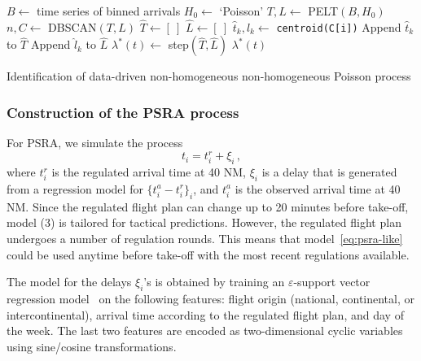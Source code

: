 \documentclass[draft,review]{elsarticle}
\begin{document}
\begin{algorithm}
\begin{algorithmic}[1]
    \STATE \(B \leftarrow \) time series of binned arrivals
    \STATE \(H_0 \leftarrow \) `Poisson'
    \STATE \(T, L \leftarrow \) PELT\((B, H_0)\)
    \STATE \(n, C \leftarrow \) DBSCAN\((T, L)\)
    \STATE {}
    \STATE \(\hat{T} \leftarrow [~] \)
    \STATE \(\hat{L} \leftarrow [~] \)
        \STATE \(\hat{t}_k, \hat{l}_k \leftarrow \) \texttt{centroid(C[i])}
        \STATE Append \(\hat{t}_k\) to \(\hat{T}\)
        \STATE Append \(\hat{l}_k\) to \(\hat{L}\)
    \ENDFOR
    \STATE \(\lambda^\ast(t) \leftarrow \) step\((\hat{T}, \hat{L})\)
    \RETURN \(\lambda^\ast(t)\)
\end{algorithmic}
\caption{Identification of data-driven non-homogeneous non-homogeneous Poisson process}\label{Alg:POISSON}
\end{algorithm}

\subsubsection{Construction of the \acs{PSRA} process}\label{sec:dm_psra}

For \ac{PSRA}, we simulate the process
\begin{equation}
\label{eq:psra-like}
t_i = t^{r}_i + \xi_i \,,
\end{equation}
where \(t^{r}_i\) is the regulated arrival time at 40 NM, \(\xi_i\) is a delay that is generated from a regression model for \(\{t^{a}_i - t^{r}_i\}_i\), and \(t^{a}_i\) is the observed arrival time at 40 NM.
Since the regulated flight plan can change up to 20 minutes before take-off, model (3) is tailored for tactical predictions. However, the regulated flight plan undergoes a number of regulation rounds.
This means that model~\eqref{eq:psra-like} could be used anytime before take-off with the most recent regulations available.

The model for the delays \(\xi_i\)'s is obtained by training an \(\varepsilon\)-support vector regression model~\citep{cristianini2000introduction} on the following features: flight origin (national, continental, or intercontinental), arrival time according to the regulated flight plan, and day of the week.
The last two features are encoded as two-dimensional cyclic variables using sine/cosine transformations.
\end{document}
